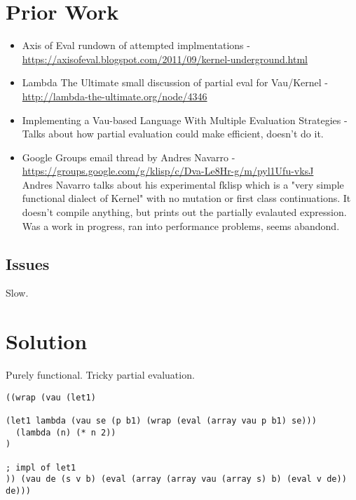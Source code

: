 \documentclass[acmsmall]{acmart}
\begin{document}
\section{Prior Work}
\begin{itemize}
    \item{} Axis of Eval rundown of attempted implmentations - \url{https://axisofeval.blogspot.com/2011/09/kernel-underground.html} \\ 
    \item{} Lambda The Ultimate small discussion of partial eval for Vau/Kernel - \url{http://lambda-the-ultimate.org/node/4346} \\ 
    \item{} Implementing a Vau-based Language With Multiple Evaluation Strategies - \cite{kearsleyimplementing} \\
      Talks about how partial evaluation could make efficient, doesn't do it.
    \item{} Google Groups email thread by Andres Navarro - \url{https://groups.google.com/g/klisp/c/Dva-Le8Hr-g/m/pyl1Ufu-vksJ} \\
      Andres Navarro talks about his experimental fklisp which is a "very simple functional dialect of Kernel" with no mutation or first class continuations.
      It doesn't compile anything, but prints out the partially evalauted expression. Was a work in progress, ran into performance problems, seems abandond.
\end{itemize}

\subsection{Issues}
    Slow.
\section{Solution}
    Purely functional.
    Tricky partial evaluation.

\begin{verbatim}
((wrap (vau (let1)

(let1 lambda (vau se (p b1) (wrap (eval (array vau p b1) se)))
  (lambda (n) (* n 2))
)

; impl of let1
)) (vau de (s v b) (eval (array (array vau (array s) b) (eval v de)) de)))
\end{verbatim}



\end{document}
